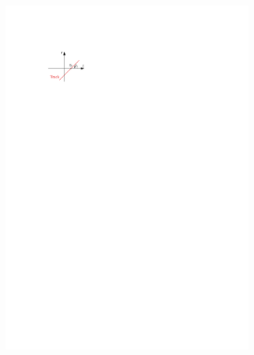 \begin{figure}[htb]
  \begin{subfigure}[t]{0.48\textwidth}
    \centering
    \includegraphics{./figures/atlas/impact_params_z0.pdf}
    \label{fig:longitudinal_impact_param}
  \end{subfigure}\hfill
  \begin{subfigure}[t]{0.48\textwidth}

\end{subfigure}
\end{figure}
